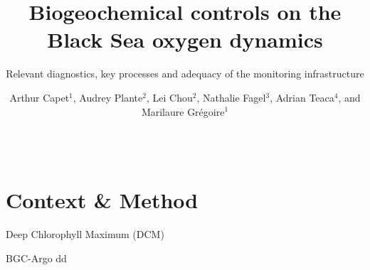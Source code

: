 \documentclass[final]{beamer}
\author[acapet@ulg.ac.be]{Arthur Capet$^1$, Audrey Plante$^2$, Lei Chou$^2$, Nathalie Fagel$^3$, Adrian Teaca$^4$, and Marilaure Grégoire$^1$}
\title{Biogeochemical controls on the Black Sea oxygen dynamics}
\subtitle{Relevant diagnostics, key processes and adequacy of the monitoring infrastructure}
\institute{
  $^1$ Modeling for aquatic systems (MAST), ULiege, Belgium
  }
\begin{document}
  \begin{frame}[fragile]\centering
    
    \begin{columns}[T]
      
      
      \begin{column}{.33\textwidth}
	\section{Context \& Method}
	\begin{block}{Deep Chlorophyll Maximum (DCM)}

	\end{block}
	
	\begin{block}{BGC-Argo}
	   dd
	\end{block}


\end{column}
\end{columns}
\end{frame}
\end{document}
